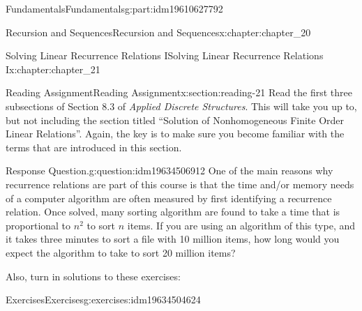 \documentclass[oneside,10pt,]{book}
\numberwithin{equation}{section}
\newenvironment{codedisplay}
{\VerbatimEnvironment\begin{center}\begin{lrbox}{\codedisplaybox}\begin{BVerbatim}}
{\end{BVerbatim}\end{lrbox}\usebox{\codedisplaybox}\end{center}}
\begin{document}
\begin{partptx}{Fundamentals}{}{Fundamentals}{}{}{g:part:idm19610627792}
\begin{chapterptx}{Recursion and Sequences}{}{Recursion and Sequences}{}{}{x:chapter:chapter_20}
\end{chapterptx}
%
\typeout{************************************************}
\typeout{************************************************}
%
\begin{chapterptx}{Solving Linear Recurrence Relations I}{}{Solving Linear Recurrence Relations I}{}{}{x:chapter:chapter_21}
%
%
%
\typeout{************************************************}
\typeout{************************************************}
%
\begin{sectionptx}{Reading Assignment}{}{Reading Assignment}{}{}{x:section:reading-21}
Read the first three subsections of Section 8.3 of \emph{Applied Discrete Structures}.  This will take you up to, but not including the section titled ``Solution of Nonhomogeneous Finite Order Linear Relations''.   Again, the key is to make sure you become familiar with the terms that are introduced in this section.%
\begin{question}{Response Question.}{g:question:idm19634506912}%
One of the main reasons why recurrence relations are part of this course is that the time and\slash{}or memory needs of a computer algorithm are often measured by first identifying a recurrence relation.  Once solved, many sorting algorithm are found to take a time that is proportional to \(n^2\) to sort \(n\) items.  If you are using an algorithm of this type, and it takes three minutes to sort a file with 10 million items, how long would you expect the algorithm to take to sort 20 million items?%
\end{question}
Also, turn in solutions to these exercises:%
%
%
\typeout{************************************************}
\typeout{************************************************}
%
\begin{exercises-subsection-numberless}{Exercises}{}{Exercises}{}{}{g:exercises:idm19634504624}

\end{exercises-subsection-numberless}
\end{sectionptx}
\end{chapterptx}
\end{partptx}
\end{document}
